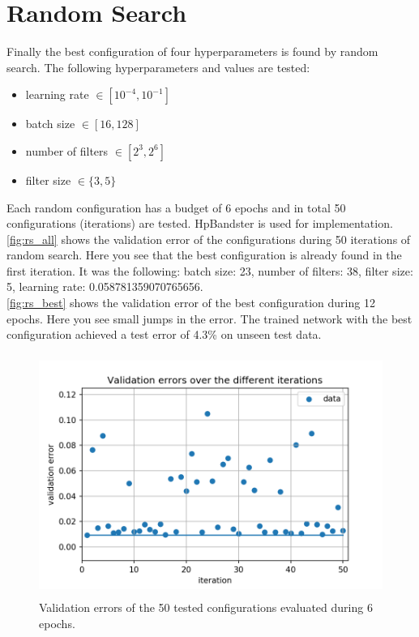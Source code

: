 \documentclass[a4paper,12pt]{article}
\begin{document}
\section{Random Search}\label{rs}

Finally the best configuration of four hyperparameters is found by random search. The following hyperparameters and values are tested:

\begin{itemize}
	\item learning rate $\in [10^{-4}, 10^{-1}] $
	\item batch size $\in [16, 128]$
	\item number of filters $\in [2^{3}, 2^{6}]$
	\item filter size $\in \{3, 5\}$
\end{itemize}

Each random configuration has a budget of 6 epochs and in total 50 configurations (iterations) are tested. HpBandster is used for implementation.\\
\autoref{fig:rs_all} shows the validation error of the configurations during 50 iterations of random search. Here you see that the best configuration is already found in the first iteration. It was the following: batch size: 23, number of filters: 38, filter size: 5, learning rate: 0.058781359070765656.\\
\autoref{fig:rs_best} shows the validation error of the best configuration during 12 epochs. Here you see small jumps in the error. The trained network with the best configuration achieved a test error of 4.3\% on unseen test data. 


\begin{figure}[H]
	\centering \includegraphics[width=11.70cm, height=7.9cm]{plots/rs/random_search.png}
	\caption{
		\label{fig:rs_all}
		Validation errors of the 50 tested configurations evaluated during 6 epochs. 
	}
\end{figure}
\end{document}
